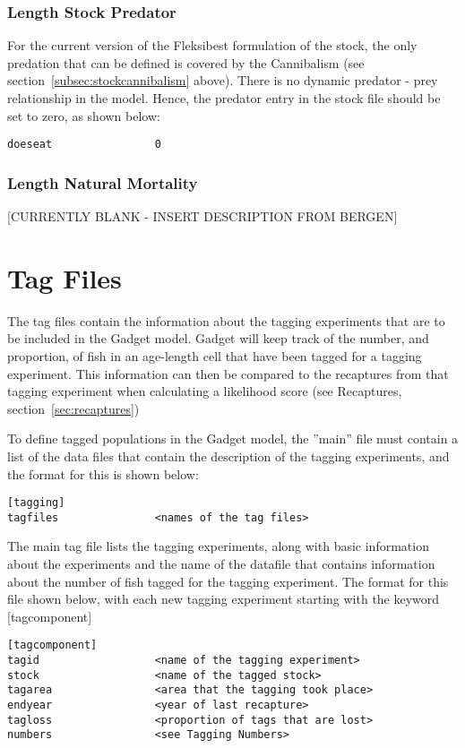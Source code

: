 \documentclass [a4paper, 10pt]{book}
\begin{document}
\subsection{Length Stock Predator}
For the current version of the Fleksibest formulation of the stock, the only predation that can be defined is covered by the Cannibalism (see section~\ref{subsec:stockcannibalism} above).  There is no dynamic predator - prey relationship in the model.  Hence, the predator entry in the stock file should be set to zero, as shown below:

{\small\begin{verbatim}
doeseat                0
\end{verbatim}}

\subsection{Length Natural Mortality}\label{subsec:lennatmort}
[CURRENTLY BLANK - INSERT DESCRIPTION FROM BERGEN]

\chapter{Tag Files}\label{chap:tag}
The tag files contain the information about the tagging experiments that are to be included in the Gadget model.  Gadget will keep track of the number, and proportion, of fish in an age-length cell that have been tagged for a tagging experiment.  This information can then be compared to the recaptures from that tagging experiment when calculating a likelihood score (see Recaptures, section~\ref{sec:recaptures})

\bigskip
To define tagged populations in the Gadget model, the ''main'' file must contain a list of the data files that contain the description of the tagging experiments, and the format for this is shown below:

{\small\begin{verbatim}
[tagging]
tagfiles               <names of the tag files>
\end{verbatim}}

The main tag file lists the tagging experiments, along with basic information about the experiments and the name of the datafile that contains information about the number of fish tagged for the tagging experiment.  The format for this file shown below, with each new tagging experiment starting with the keyword [tagcomponent]

{\small\begin{verbatim}
[tagcomponent]
tagid                  <name of the tagging experiment>
stock                  <name of the tagged stock>
tagarea                <area that the tagging took place>
endyear                <year of last recapture>
tagloss                <proportion of tags that are lost>
numbers                <see Tagging Numbers>
\end{verbatim}}
\end{document}
